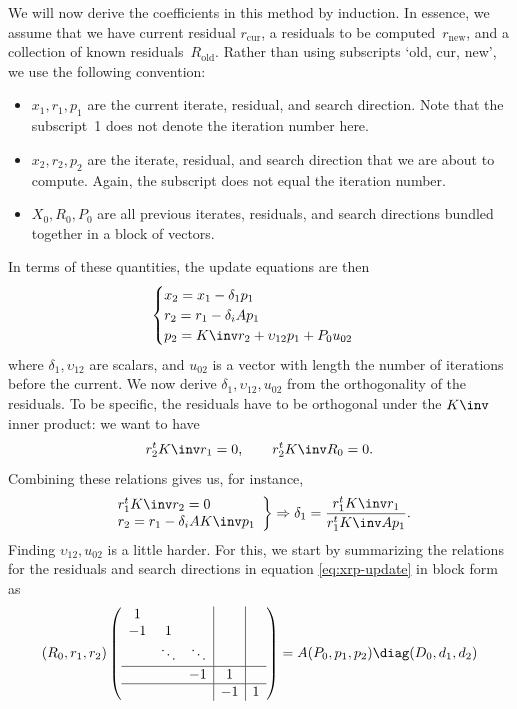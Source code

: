 We will now derive the coefficients in this method by induction. In
essence, we assume that we have current residual $r_{\mathrm{cur}}$, a
residuals to be computed~$r_{\mathrm{new}}$, and a collection of known
residuals~$R_{\mathrm{old}}$. Rather than using subscripts `old, cur,
new', we use the following convention:
\begin{itemize}
\item $x_1,r_1,p_1$ are the current iterate, residual, and search
  direction. Note that the subscript~1 does not denote the iteration
  number here.
\item $x_2,r_2,p_2$ are the iterate, residual, and search direction
  that we are about to compute. Again, the subscript does not equal
  the iteration number.
\item $X_0,R_0,P_0$ are all previous iterates, residuals, and search
  directions bundled together in a block of vectors.
\end{itemize}
In terms of these quantities, the update equations are then
\begin{equation}
\begin{cases}
  x_2=x_1-\delta_1 p_1 \\
  r_2=r_1-\delta_iA p_1 \\
  p_2 = K\inv r_2+\upsilon_{12}p_1+P_0u_{02}
\end{cases}
\label{eq:cg-updates-xrp}
\end{equation}
where $\delta_1,\upsilon_{12}$ are scalars, and $u_{02}$ is a vector with
length the number of iterations before the current. We now derive
$\delta_1,\upsilon_{12},u_{02}$ from the orthogonality of the residuals. To
be specific, the residuals have to be orthogonal under the $K\inv$
inner product: we want to have
\[
  r_2^tK\inv r_1=0,\qquad r_2^tK\inv R_0=0.
\]
Combining these relations gives us, for instance,
\[
  \left.
  \begin{array}{l}
    r_1^tK\inv r_2=0\\   r_2=r_1-\delta_iAK\inv p_1
  \end{array}
  \right\} \Rightarrow
  \delta_1 = \frac{r_1^tK\inv r_1}{r_1^tK\inv Ap_1}.
\]
Finding $\upsilon_{12},u_{02}$ is a little harder. For this, we start by
summarizing the relations for the residuals and search directions
in equation \eqref{eq:xrp-update} in block
form as 
\[
  (R_0,r_1,r_2) \left(
\begin{array}{r|c|c}
  \begin{matrix}1\\ -1&1\\ &\ddots&\ddots \end{matrix}
  &&\\ \hline -1&1&\\ \hline &-1&1
\end{array}
  \right) = A(P_0,p_1,p_2)\diag(D_0,d_1,d_2)
\]
